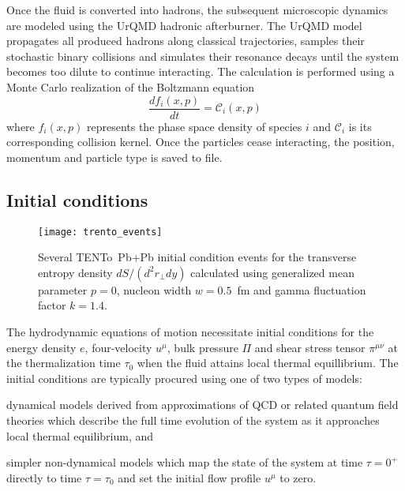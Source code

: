 \documentclass[aps,prc,reprint,amsmath,nofootinbib]{revtex4-1}
\newcommand{\trento}{T\raisebox{-0.5ex}{R}ENTo}
\begin{document}
Once the fluid is converted into hadrons, the subsequent microscopic dynamics are modeled using the UrQMD hadronic afterburner.
The UrQMD model propagates all produced hadrons along classical trajectories, samples their stochastic binary collisions and simulates their resonance decays until the system becomes too dilute to continue interacting.
The calculation is performed using a Monte Carlo realization of the Boltzmann equation
\begin{equation}
    \frac{df_i(x,p)}{dt} = \mathcal{C}_i(x, p)
\end{equation}
where $f_i(x,p)$ represents the phase space density of species $i$ and $\mathcal{C}_i$ is its corresponding collision kernel.
Once the particles cease interacting, the position, momentum and particle type is saved to file.

\subsection{Initial conditions}

\begin{figure}
    \texttt{[image: trento\_events]}
    \caption{Several \protect\trento\ Pb+Pb initial condition events for the transverse entropy density $dS/(d^2r_\perp dy)$ calculated using generalized mean parameter $p=0$, nucleon width $w=0.5$~fm and gamma fluctuation factor $k=1.4$.}
\end{figure}

The hydrodynamic equations of motion necessitate initial conditions for the energy density $e$, four-velocity $u^\mu$, bulk pressure $\Pi$ and shear stress tensor $\pi^{\mu\nu}$ at the thermalization time $\tau_0$ when the fluid attains local thermal equillibrium. The initial conditions are typically procured using one of two types of models:
\begin{enumerate*}[label={\arabic*)}]
    \item dynamical models derived from approximations of QCD or related quantum field theories which describe the full time evolution of the system as it approaches local thermal equilibrium, and 
    \item simpler non-dynamical models which map the state of the system at time $\tau=0^+$ directly to time $\tau=\tau_0$ and set the initial flow profile $u^\mu$ to zero.
\end{enumerate*}
\end{document}
